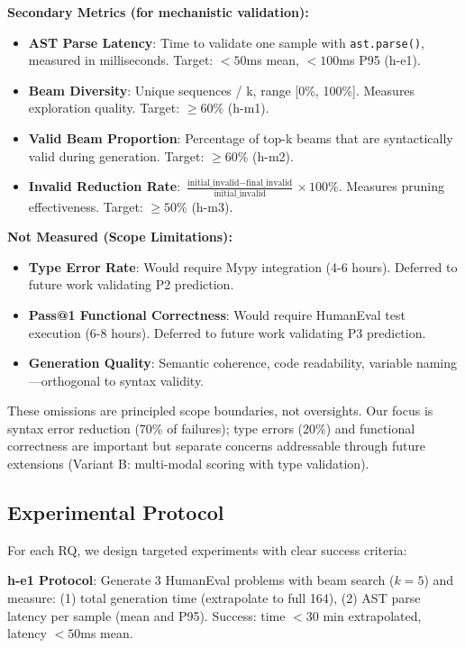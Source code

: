\textbf{Secondary Metrics (for mechanistic validation):}
\begin{itemize}
\item \textbf{AST Parse Latency}: Time to validate one sample with \texttt{ast.parse()}, measured in milliseconds. Target: $<50$ms mean, $<100$ms P95 (h-e1).
\item \textbf{Beam Diversity}: Unique sequences / k, range [0\%, 100\%]. Measures exploration quality. Target: $\geq 60$\% (h-m1).
\item \textbf{Valid Beam Proportion}: Percentage of top-k beams that are syntactically valid during generation. Target: $\geq 60$\% (h-m2).
\item \textbf{Invalid Reduction Rate}: $\frac{\text{initial\_invalid} - \text{final\_invalid}}{\text{initial\_invalid}} \times 100\%$. Measures pruning effectiveness. Target: $\geq 50$\% (h-m3).
\end{itemize}

\textbf{Not Measured (Scope Limitations):}
\begin{itemize}
\item \textbf{Type Error Rate}: Would require Mypy integration (4-6 hours). Deferred to future work validating P2 prediction.
\item \textbf{Pass@1 Functional Correctness}: Would require HumanEval test execution (6-8 hours). Deferred to future work validating P3 prediction.
\item \textbf{Generation Quality}: Semantic coherence, code readability, variable naming---orthogonal to syntax validity.
\end{itemize}

These omissions are principled scope boundaries, not oversights. Our focus is syntax error reduction (70\% of failures); type errors (20\%) and functional correctness are important but separate concerns addressable through future extensions (Variant B: multi-modal scoring with type validation).

\subsection{Experimental Protocol}

For each RQ, we design targeted experiments with clear success criteria:

\textbf{h-e1 Protocol}: Generate 3 HumanEval problems with beam search ($k=5$) and measure: (1) total generation time (extrapolate to full 164), (2) AST parse latency per sample (mean and P95). Success: time $<30$ min extrapolated, latency $<50$ms mean.

